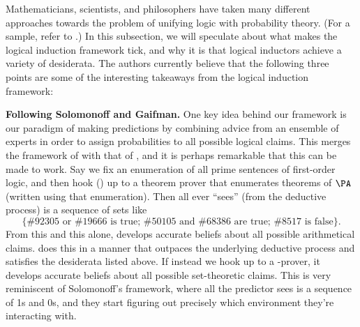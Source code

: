 \documentclass[authordate,onecolumn,noenvironments]{miri-tech-article}
\numberwithin{equation}{subsection}
\newcommand{\tinysection}[1]{\medskip\noindent\textbf{#1.}}
\newcommand{\LIA}{\text{\upshape{\texttt{LIA}}}\xspace}
\begin{document}
Mathematicians, scientists, and philosophers have taken many different approaches towards the problem of unifying logic with probability theory. (For a sample, refer to .) In this subsection, we will speculate about what makes the logical induction framework tick, and why it is that logical inductors achieve a variety of desiderata. The authors currently believe that the following three points are some of the interesting takeaways from the logical induction framework:

\tinysection{Following Solomonoff and Gaifman} One key idea behind our framework is our paradigm of making predictions by combining advice from an ensemble of experts in order to assign probabilities to all possible logical claims. This merges the framework of \citet{Solomonoff:1964} with that of \citet{Gaifman:1964}, and it is perhaps remarkable that this can be made to work. Say we fix an enumeration of all prime sentences of first-order logic, and then hook \LIA () up to a theorem prover that enumerates theorems of $\PA$ (written using that enumeration). Then all \LIA ever ``sees'' (from the deductive process) is a sequence of sets like
\[
  \text{\{\#92305 or \#19666 is true; \#50105 and \#68386 are true; \#8517 is false\}.}
\]
From this and this alone, \LIA develops accurate beliefs about all possible arithmetical claims. \LIA does this in a manner that outpaces the underlying deductive process and satisfies the desiderata listed above. If instead we hook \LIA up to a \ZFC-prover, it  develops accurate beliefs about all possible set-theoretic claims. This is very reminiscent of Solomonoff's framework, where all the predictor sees is a sequence of 1s and 0s, and they start figuring out precisely which environment they're interacting with.
\end{document}
